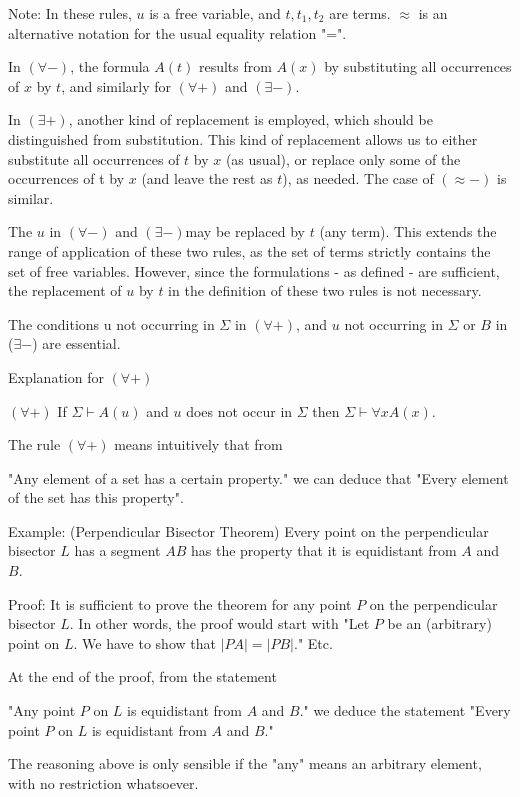 \documentclass{article}
\begin{document}
Note: In these rules, $u$ is a free variable, and $t, t_1, t_2$ are terms. $\approx$ is an alternative notation for the usual equality relation "=".

In $(\forall -)$, the formula $A(t)$ results from $A(x)$ by substituting all occurrences of $x$ by $t$, and similarly for $(\forall +)$ and $(\exists -)$.

In $(\exists +)$, another kind of replacement is employed, which should be distinguished from substitution. This kind of replacement allows us to either substitute all occurrences of $t$ by $x$ (as usual), or replace only some of the occurrences of t by $x$ (and leave the rest as $t$), as needed. The case of $(\approx -)$ is similar.

The $u$ in $(\forall -)$ and $(\exists -) $may be replaced by $t$ (any term). This extends the range of application of these two rules, as the set of terms strictly contains the set of free variables. However, since the formulations - as defined - are sufficient, the replacement of $u$ by $t$ in the definition of these two rules is not necessary.

The conditions u not occurring in $\Sigma$ in $(\forall +)$, and $u$ not occurring in $\Sigma$ or $B$ in ($\exists -$) are essential.

Explanation for $(\forall +)$

$(\forall +)$ If $\Sigma \vdash A(u)$ and $u$ does not occur in $\Sigma$ then $\Sigma \vdash \forall x A(x)$.

The rule $(\forall +)$ means intuitively that from

"Any element of a set has a certain property." we can deduce that "Every element of the set has this property".

Example: (Perpendicular Bisector Theorem) Every point on the perpendicular bisector $L$ has a segment $AB$ has the property that it is equidistant from $A$ and $B$.

Proof: It is sufficient to prove the theorem for any point $P$ on the perpendicular bisector $L$. In other words, the proof would start with "Let $P$ be an (arbitrary) point on $L$. We have to show that $|PA| = |PB|$." Etc.

At the end of the proof, from the statement

"Any point $P$ on $L$ is equidistant from $A$ and $B$." we deduce the statement "Every point $P$ on $L$ is equidistant from $A$ and $B$."

The reasoning above is only sensible if the "any" means an arbitrary element, with no restriction whatsoever.
\end{document}
